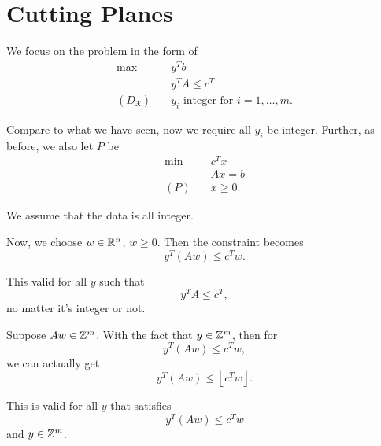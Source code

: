 \section{Cutting Planes}
\begin{prev}
	We focus on the problem in the form of
	\begin{align*}
		\max~                    & y^{T}b                                      \\
		                         & y^{T}A\leq c^{T}                            \\
		(D_{\mathfrak{X} })\quad & y_{i}\text{ integer for }i = 1, \ldots , m.
	\end{align*}
	\begin{note}
		Compare to what we have seen, now we require all \(y_{i}\) be integer. Further, as before, we also let \(P\) be
		\begin{align*}
			\min~    & c^Tx     \\
			         & Ax = b   \\
			(P)\quad & x\geq 0.
		\end{align*}
	\end{note}
\end{prev}
\begin{remark}
	We assume that the data is all integer.
\end{remark}

Now, we choose \(w\in \mathbb{\MakeUppercase{R}}^n\), \(w\geq 0\). Then the constraint becomes
\[
	y^{T}(Aw) \leq c^{T}w.
\]
\begin{remark}
	This valid for all \(y\) such that
	\[
		y^{T}A\leq c^{T},
	\]
	no matter it's integer or not.
\end{remark}

Suppose \(Aw\in\mathbb{\MakeUppercase{Z}}^m\). With the fact that \(y\in \mathbb{\MakeUppercase{Z}}^m\), then for
\[
	y^{T}(Aw)\leq c^{T}w,
\]
we can actually get
\[
	y^{T}(Aw)\leq \left\lfloor c^{T}w \right\rfloor.
\]
\begin{remark}
	This is valid for all \(y\) that satisfies
	\[
		y^{T}(Aw)\leq c^{T}w
	\]
	and \(y\in \mathbb{\MakeUppercase{Z}}^m\).
\end{remark}
\begin{figure}[H]
	\centering
	\label{fig:Cutting-planes-tighter-bound}
\end{figure}


